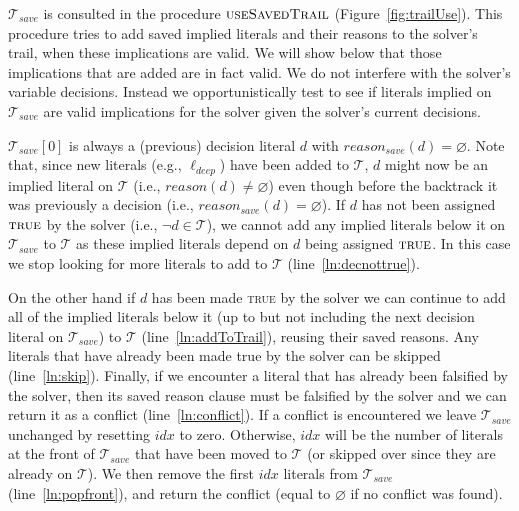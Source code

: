 \documentclass[runningheads]{llncs}
\newcommand{\trail}{\ensuremath{\mathcal{T}}}
\newcommand{\true}{\textsc{true}\xspace}
\newcommand{\reason}[1]{\ensuremath{\mathit{reason}(#1)}}
\newcommand{\reasonsave}[1]{\ensuremath{\mathit{reason_{\mathit{save}}(#1)}}}
\newcommand{\deepestLit}{\ell_{\textit{deep}}}
\newcommand{\trailsave}{\trail_{\mathit{save}}}
\newcommand{\ust}{\textsc{useSavedTrail}\xspace}
\begin{document}
$\trailsave$ is consulted in the procedure $\ust$
(Figure~\ref{fig:trailUse}). This procedure tries to add saved implied
literals and their reasons to the solver's trail, when these
implications are valid. We will show below that those implications
that are added are in fact valid. We do not interfere with the
solver's variable decisions. Instead we opportunistically test to see
if literals implied on $\trailsave$ are valid implications for the
solver given the solver's current decisions.

$\trailsave[0]$ is always a (previous) decision literal $d$ with
$\reasonsave{d}=\varnothing$. Note that, since new literals (e.g.,
$\deepestLit$) have been added to $\trail$, $d$ might now be an
implied literal on $\trail$ (i.e., $\reason{d}\neq\varnothing$) even
though before the backtrack it was previously a decision (i.e.,
$\reasonsave{d}=\varnothing$). If $d$ has not been assigned $\true$ by
the solver (i.e., $\lnot d \in \trail$), we cannot add any implied
literals below it on $\trailsave$ to $\trail$ as these implied
literals depend on $d$ being assigned $\true$. In this case we stop
looking for more literals to add to $\trail$
(line~\ref{ln:decnottrue}).

On the other hand if $d$ has been made \true by the solver we can
continue to add all of the implied literals below it (up to but not
including the next decision literal on $\trailsave$) to $\trail$
(line~\ref{ln:addToTrail}), reusing their saved reasons. Any literals
that have already been made true by the solver can be skipped
(line~\ref{ln:skip}). Finally, if we encounter a literal that has
already been falsified by the solver, then its saved reason clause
must be falsified by the solver and we can return it as a conflict
(line~\ref{ln:conflict}). If a conflict is encountered we leave
$\trailsave$ unchanged by resetting $idx$ to zero. Otherwise, $idx$
will be the number of literals at the front of $\trailsave$ that have
been moved to $\trail$ (or skipped over since they are already on
$\trail$). We then remove the first $idx$ literals from $\trailsave$
(line~\ref{ln:popfront}), and return the conflict (equal to
$\varnothing$ if no conflict was found).
\end{document}
